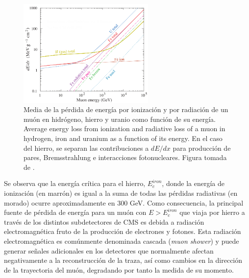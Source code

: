 \begin{figure}
\centering
\includegraphics[width=0.60\textwidth]{figures/dEdx.png}
\caption{Media de la p\'erdida de energ\'ia por ionizaci\'on y por radiaci\'on de un mu\'on en hidr\'ogeno, hierro y uranio como funci\'on de su energ\'ia.  Average energy loss from ionization and radiative loss of a muon in hydrogen, iron and uranium as a function of its energy. En el caso del hierro, se separan las contribuciones a $dE/dx$ para producci\'on de pares, Bremsstrahlung e interacciones fotonucleares. Figura tomada de \cite{Tanabashi:2018oca}.}
\label{fig:dEdX}        
\end{figure}

Se observa que la energ\'ia cr\'itica para el hierro, $E^{iron}_{c}$, donde la energ\'ia de ionizaci\'on (en marr\'on) es igual a la suma de todas las p\'erdidas radiativas (en morado) ocurre aproximadamente en 300 GeV. Como consecuencia, la principal fuente de p\'erdida de energ\'ia para un mu\'on con $E>E^{iron}_{c}$ que viaja por hierro a trav\'es de los distintos subdetectores de CMS es debida a radiaci\'on electromagn\'etica fruto de la producci\'on de electrones y fotones. Esta radiaci\'on electromagn\'etica es com\'unmente denominada cascada (\textit{muon shower}) y puede generar se\~nales adicionales en los detectores que normalmente afectan negativamente a la reconstrucci\'on de la traza, as\'i como cambios en la direcci\'on de la trayectoria del mu\'on, degradando por tanto la medida de su momento. \\

